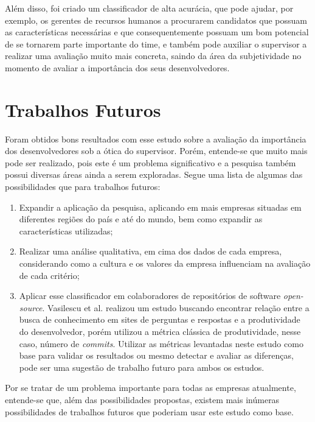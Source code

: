 Além disso, foi criado um classificador de alta acurácia, que pode ajudar, por exemplo, os gerentes de recursos humanos a procurarem candidatos que possuam as características necessárias e que consequentemente possuam um bom potencial de se tornarem parte importante do time, e também pode auxiliar o supervisor a realizar uma avaliação muito mais concreta, saindo da área da subjetividade no momento de avaliar a importância dos seus desenvolvedores.


\section{Trabalhos Futuros}

Foram obtidos bons resultados com esse estudo sobre a avaliação da importância dos desenvolvedores sob a ótica do supervisor. Porém, entende-se que muito mais pode ser realizado, pois este é um problema significativo e a pesquisa também possui diversas áreas ainda a serem exploradas. Segue uma lista de algumas das possibilidades que para trabalhos futuros:
\begin{enumerate}
	\item Expandir a aplicação da pesquisa, aplicando em mais empresas situadas em diferentes regiões do país e até do mundo, bem como expandir as características utilizadas;
	\item Realizar uma análise qualitativa, em cima dos dados de cada empresa, considerando como a cultura e os valores da empresa influenciam na avaliação de cada critério;
	\item Aplicar esse classificador em colaboradores de repositórios de software \textit{open-source}. Vasilescu et al. \cite{Vasilescu2013} realizou um estudo buscando encontrar relação entre a busca de conhecimento em sites de perguntas e respostas e a produtividade do desenvolvedor, porém utilizou a métrica clássica de produtividade, nesse caso, número de \textit{commits}. Utilizar as métricas levantadas neste estudo como base para validar os resultados ou mesmo detectar e avaliar as diferenças, pode ser uma sugestão de trabalho futuro para ambos os estudos.
\end{enumerate}

Por se tratar de um problema importante para todas as empresas atualmente, entende-se que, além das possibilidades propostas, existem mais inúmeras possibilidades de trabalhos futuros que poderiam usar este estudo como base.
